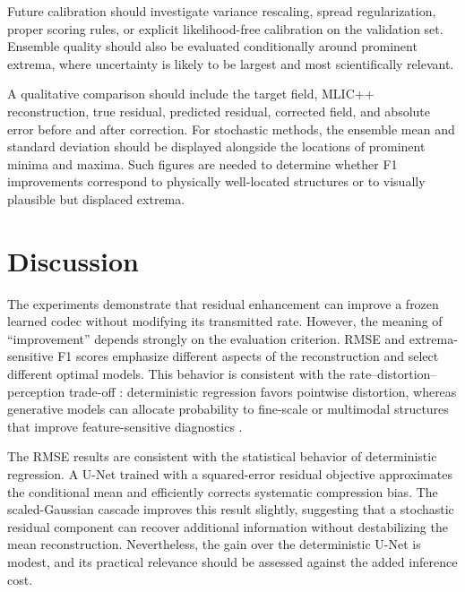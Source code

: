 \documentclass[11pt]{article}
\begin{document}
Future calibration should investigate variance rescaling, spread regularization, proper scoring rules, or explicit likelihood-free calibration on the validation set. Ensemble quality should also be evaluated conditionally around prominent extrema, where uncertainty is likely to be largest and most scientifically relevant.

A qualitative comparison should include the target field, MLIC++ reconstruction, true residual, predicted residual, corrected field, and absolute error before and after correction. For stochastic methods, the ensemble mean and standard deviation should be displayed alongside the locations of prominent minima and maxima. Such figures are needed to determine whether F1 improvements correspond to physically well-located structures or to visually plausible but displaced extrema.

\section{Discussion}

The experiments demonstrate that residual enhancement can improve a frozen learned codec without modifying its transmitted rate. However, the meaning of ``improvement'' depends strongly on the evaluation criterion. RMSE and extrema-sensitive F1 scores emphasize different aspects of the reconstruction and select different optimal models. This behavior is consistent with the rate--distortion--perception trade-off \cite{blau2019rethinking}: deterministic regression favors pointwise distortion, whereas generative models can allocate probability to fine-scale or multimodal structures that improve feature-sensitive diagnostics \cite{mentzer2020high,yang2023lossy,ghouse2023residual}.

The RMSE results are consistent with the statistical behavior of deterministic regression. A U-Net trained with a squared-error residual objective approximates the conditional mean and efficiently corrects systematic compression bias. The scaled-Gaussian cascade improves this result slightly, suggesting that a stochastic residual component can recover additional information without destabilizing the mean reconstruction. Nevertheless, the gain over the deterministic U-Net is modest, and its practical relevance should be assessed against the added inference cost.
\end{document}
